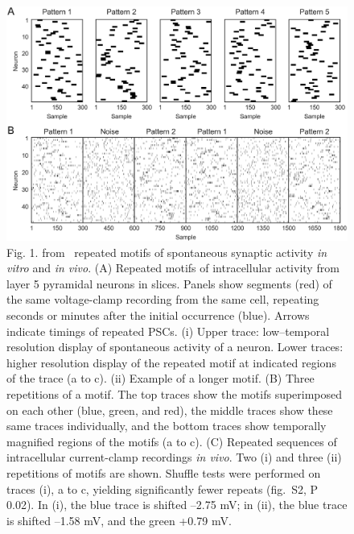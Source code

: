 \documentclass[brainsci, %
               review,submit,pdftex,moreauthors
               ]{Definitions/mdpi}
\begin{document}
\begin{figure}
\centering
\includegraphics[width=\linewidth]{figures/pcbi.1006283.g001.png}%
\caption{Fig. 1. from~\citep{ikegaya_synfire_2004} repeated motifs of spontaneous synaptic activity \textit{in vitro} and \textit{in vivo}. (A) Repeated motifs of intracellular activity from layer 5 pyramidal neurons in slices. Panels show segments (red) of the same voltage-clamp recording from the same cell, repeating seconds or minutes after the initial occurrence (blue). Arrows indicate timings of repeated PSCs. (i) Upper trace: low--temporal resolution display of spontaneous activity of a neuron. Lower traces: higher resolution display of the repeated motif at indicated regions of the trace (a to c). (ii) Example of a longer motif. (B) Three repetitions of a motif. The top traces show the motifs superimposed on each other (blue, green, and red), the middle traces show these same traces individually, and the bottom traces show temporally magnified regions of the motifs (a to c). (C) Repeated sequences of intracellular current-clamp recordings \textit{in vivo}. Two (i) and three (ii) repetitions of motifs are shown. Shuffle tests were performed on traces (i), a to c, yielding significantly fewer repeats (fig.~S2, P  0.02). In (i), the blue trace is shifted --2.75 mV; in (ii), the blue trace is shifted --1.58 mV, and the green +0.79 mV.}\label{fig:Ikegaya2004}
\end{figure}
%
\end{document}
